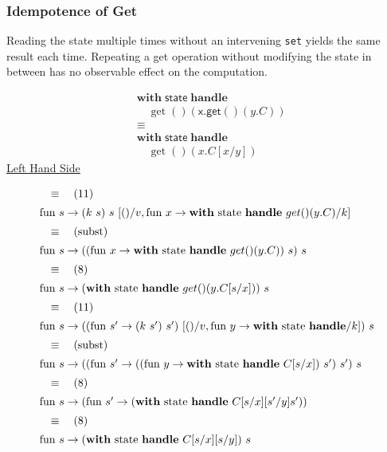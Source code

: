 \documentclass[logo,bsc,singlespacing,parskip]{infthesis}
\begin{document}
\subsubsection*{Idempotence of Get}
Reading the state multiple times without an intervening \lstinline{set} yields the same result each time. Repeating a get operation without modifying the state in between has no observable effect on the computation.


\[
\begin{aligned}
    &\mathsf{\textbf{with}} \; \mathsf{state} \; \mathsf{\textbf{handle}} \\
    &\quad \operatorname{get}() \left( \mathsf{x.get}() \left( y.C \right) \right) \\
    &\equiv \\
    &\mathsf{\textbf{with}} \; \mathsf{state} \; \mathsf{\textbf{handle}} \\
    &\quad \operatorname{get}() \left( x.C[x/y] \right)
\end{aligned}
\]
\underline{Left Hand Side}

\[ 
\begin{array}{l}
\quad\equiv\quad (11) \\[5pt]
\text{fun } s \rightarrow (k\ s)\ s\ [()/v, \text{fun } x \rightarrow \text{\textbf{with} state \textbf{handle} } get()(y.C)/k] \\[5pt]
\quad\equiv\quad (\text{subst}) \\[5pt]
\text{fun } s \rightarrow ((\text{fun } x \rightarrow \text{\textbf{with} state \textbf{handle} } get()(y.C))\ s)\ s \\[5pt]
\quad\equiv\quad (8) \\[5pt]
\text{fun } s \rightarrow (\text{\textbf{with} state \textbf{handle} } get()(y.C[s/x]))\ s \\[5pt]
\quad\equiv\quad (11) \\[5pt]
\text{fun } s \rightarrow ((\text{fun } s'\rightarrow (k\ s')\ s')\ [()/v, \text{fun } y\rightarrow \text{\textbf{with} state \textbf{handle}}/k])\ s \\[5pt]
\quad\equiv\quad (\text{subst}) \\[5pt]
\text{fun } s \rightarrow ((\text{fun } s' \rightarrow (( \text{fun } y \rightarrow \text{\textbf{with} state \textbf{handle} } C[s/x])\ s')\ s')\ s \\[5pt]
\quad\equiv\quad (8) \\[5pt]
\text{fun } s \rightarrow (\text{fun } s' \rightarrow (\text{\textbf{with} state \textbf{handle} } C[s/x][s'/y]s')) \\[5pt]
\quad\equiv\quad (8) \\[5pt]
\text{fun } s \rightarrow (\text{\textbf{with} state \textbf{handle} } C[s/x][s/y])\ s
\end{array}
\]
\end{document}
